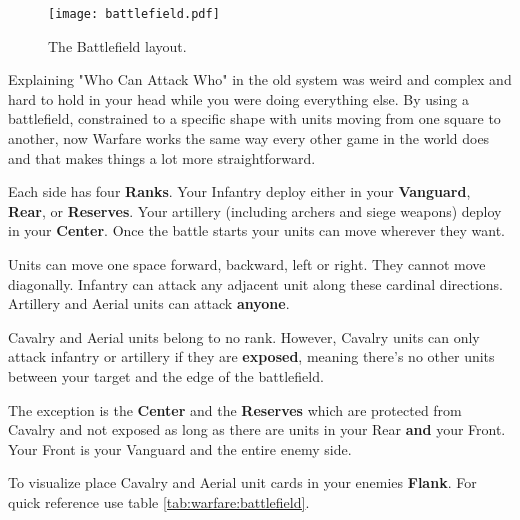 \documentclass[letterpaper,twocolumn,openany,nodeprecatedcode]{dndbook}
\begin{document}
\begin{figure}
    \texttt{[image: battlefield.pdf]}
    \caption{The Battlefield layout.}
    \label{fig:battlefield}
\end{figure}


\begin{DndReadAloud}
    Explaining "Who Can Attack Who" in the old system was weird and complex and hard to hold in your head while you were doing everything else. By using a battlefield, constrained to a specific shape with units moving from one square to another, now Warfare works the same way every other game in the world does and that makes things a lot more straightforward.
\end{DndReadAloud}


Each side has four \textbf{Ranks}. Your Infantry deploy either in your \textbf{Vanguard}, \textbf{Rear}, or \textbf{Reserves}. Your artillery (including archers and siege weapons) deploy in your \textbf{Center}. Once the battle starts your units can move wherever they want.

Units can move one space forward, backward, left or right. They cannot move diagonally. Infantry can attack any adjacent unit along these cardinal directions. Artillery and Aerial units can attack \textbf{anyone}.

Cavalry and Aerial units belong to no rank. However, Cavalry units can only attack infantry or artillery if they are \textbf{exposed}, meaning there’s no other units between your target and the edge of the battlefield.

The exception is the \textbf{Center} and the \textbf{Reserves} which are protected from Cavalry and not exposed as long as there are units in your Rear \textbf{and} your Front. Your Front is your Vanguard and the entire enemy side.

To visualize place Cavalry and Aerial unit cards in your enemies \textbf{Flank}. For quick reference use table \ref{tab:warfare:battlefield}.
\end{document}
